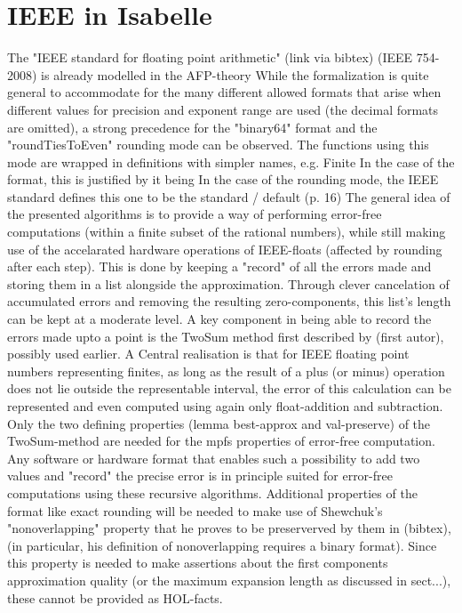 \documentclass[11pt,a4paper]{article}
\begin{document}
\section{IEEE in Isabelle}

The "IEEE standard for floating point arithmetic" (link via bibtex) (IEEE 754-2008) is already modelled in the AFP-theory
While the formalization is quite general to accommodate for the many different allowed formats that arise when different values for precision and exponent range are used (the decimal formats are omitted), a strong precedence for the "binary64" format and the "roundTiesToEven" rounding mode can be observed. The functions using this mode are wrapped in definitions with simpler names, e.g. Finite
In the case of the format, this is justified by it being
In the case of the rounding mode, the IEEE standard defines this one to be the standard / default (p. 16)
The general idea of the presented algorithms is to provide a way of performing error-free computations (within a finite subset of the rational numbers), while still making use of the accelarated hardware operations of IEEE-floats (affected by rounding after each step). This is done by keeping a "record" of all the errors made and storing them in a list alongside the approximation. Through clever cancelation of accumulated errors and removing the resulting zero-components, this list's length can be kept at a moderate level.
A key component in being able to record the errors made upto a point is the TwoSum method first described by (first autor), possibly used earlier. A Central realisation is that for IEEE floating point numbers representing finites, as long as the result of a plus (or minus) operation does not lie outside the representable interval, the error of this calculation can be represented and even computed using again only float-addition and subtraction.
Only the two defining properties (lemma best-approx and val-preserve) of the TwoSum-method are needed for the mpfs properties of error-free computation. Any software or hardware format that enables such a possibility to add two values and "record" the precise error is in principle suited for error-free computations using these recursive algorithms. Additional properties of the format like exact rounding will be needed to make use of Shewchuk's "nonoverlapping" property that he proves to be preserverved by them in (bibtex), (in particular, his definition of nonoverlapping requires a binary format). Since this property is needed to make assertions about the first components approximation quality (or the maximum expansion length as discussed in sect...), these cannot be provided as HOL-facts.
\end{document}

